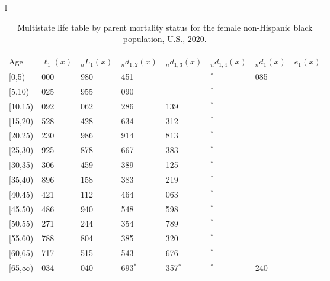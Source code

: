 \documentclass[
]{article}
\begin{document}
\begin{table}
\caption{\label{tab:table-nhblack-female}Multistate life table by parent mortality status for the female non-Hispanic black population, U.S., 2020.}

\centering
\fontsize{9}{11}\selectfont
\begin{tabular}[t]{l}
\hline
\begin{tabular}{>{\raggedright\arraybackslash}p{.45in}>{\raggedleft\arraybackslash}p{.65in}>{\raggedleft\arraybackslash}p{.65in}>{\raggedleft\arraybackslash}p{.65in}>{\raggedleft\arraybackslash}p{.65in}>{\raggedleft\arraybackslash}p{.65in}>{\raggedleft\arraybackslash}p{.65in}>{\raggedleft\arraybackslash}p{.65in}}
\toprule
\multicolumn{1}{c}{ } & \multicolumn{7}{c}{(1) Lost neither} \\
\cmidrule(l{3pt}r{3pt}){2-8}
Age & $\ell_{1}(x)$ & ${}_nL_{1}(x)$ & ${}_nd_{1,2}(x)$ & ${}_nd_{1,3}(x)$ & ${}_nd_{1,4}(x)$ & ${}_nd_{1}(x)$ & $e_{1}(x)$\\
\midrule
{}[0,5) & 100 000 & 490 980 & 1 451 & 331 & 108$^{*}$ & 1 085 & 39\\
{}[5,10) & 97 025 & 477 955 & 2 090 & 759 & 0$^{*}$ & 85 & 35\\
{}[10,15) & 94 092 & 463 062 & 2 286 & 1 139 & 52$^{*}$ & 87 & 30\\
{}[15,20) & 90 528 & 439 428 & 3 634 & 1 312 & 113$^{*}$ & 238 & 25\\
{}[20,25) & 85 230 & 411 986 & 2 914 & 1 813 & 163$^{*}$ & 416 & 21\\
\addlinespace
{}[25,30) & 79 925 & 381 878 & 3 667 & 1 383 & 91$^{*}$ & 479 & 17\\
{}[30,35) & 74 306 & 342 459 & 5 389 & 2 125 & 302$^{*}$ & 594 & 13\\
{}[35,40) & 65 896 & 294 158 & 6 383 & 2 219 & 170$^{*}$ & 704 & 10\\
{}[40,45) & 56 421 & 242 112 & 5 464 & 3 063 & 581$^{*}$ & 827 & 7\\
{}[45,50) & 46 486 & 175 940 & 5 548 & 3 598 & 252$^{*}$ & 817 & 4\\
\addlinespace
{}[50,55) & 36 271 & 109 244 & 6 354 & 1 789 & 609$^{*}$ & 732 & 2\\
{}[55,60) & 26 788 & 58 804 & 5 385 & 2 320 & 772$^{*}$ & 594 & 1\\
{}[60,65) & 17 717 & 24 515 & 1 543 & 1 676 & 95$^{*}$ & 367 & 1\\
{}[65,$\infty$) & 14 034 & 22 040 & 2 693$^{*}$ & 1 357$^{*}$ & 579$^{*}$ & 1 240 & 0\\
\end{tabular}\\

\end{tabular}
\end{table}
\end{document}
